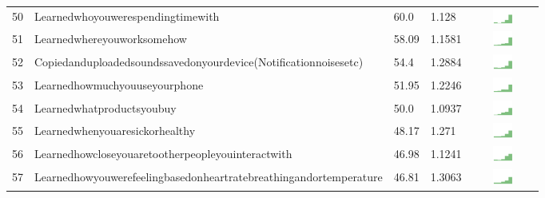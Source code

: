 \documentclass[a4paper,12pt]{article}
\begin{document}
\begin{longtable}{| p{0.5cm} | p{7cm} | p{1cm} |p{1cm} | c |}
50 & Learnedwhoyouwerespendingtimewith & 60.0&1.128 & \includegraphics[width = 2cm, height = 0.5cm]{tables/learnedwhoyouwerespendingtimewithcombined} \\ 
51 & Learnedwhereyouworksomehow & 58.09&1.1581 & \includegraphics[width = 2cm, height = 0.5cm]{tables/learnedwhereyouworksomehowcombined} \\ 
52 & Copiedanduploadedsoundssavedonyourdevice(Notificationnoisesetc) & 54.4&1.2884 & \includegraphics[width = 2cm, height = 0.5cm]{tables/copiedanduploadedsoundssavedonyourdevice(notificationnoisesetc)combined} \\ 
53 & Learnedhowmuchyouuseyourphone & 51.95&1.2246 & \includegraphics[width = 2cm, height = 0.5cm]{tables/learnedhowmuchyouuseyourphonecombined} \\ 
54 & Learnedwhatproductsyoubuy & 50.0&1.0937 & \includegraphics[width = 2cm, height = 0.5cm]{tables/learnedwhatproductsyoubuycombined} \\ 
55 & Learnedwhenyouaresickorhealthy & 48.17&1.271 & \includegraphics[width = 2cm, height = 0.5cm]{tables/learnedwhenyouaresickorhealthycombined} \\ 
56 & Learnedhowcloseyouaretootherpeopleyouinteractwith & 46.98&1.1241 & \includegraphics[width = 2cm, height = 0.5cm]{tables/learnedhowcloseyouaretootherpeopleyouinteractwithcombined} \\ 
57 & Learnedhowyouwerefeelingbasedonheartratebreathingandortemperature & 46.81&1.3063 & \includegraphics[width = 2cm, height = 0.5cm]{tables/learnedhowyouwerefeelingbasedonheartratebreathingandortemperaturecombined} \\ 

\end{longtable}
\end{document}
